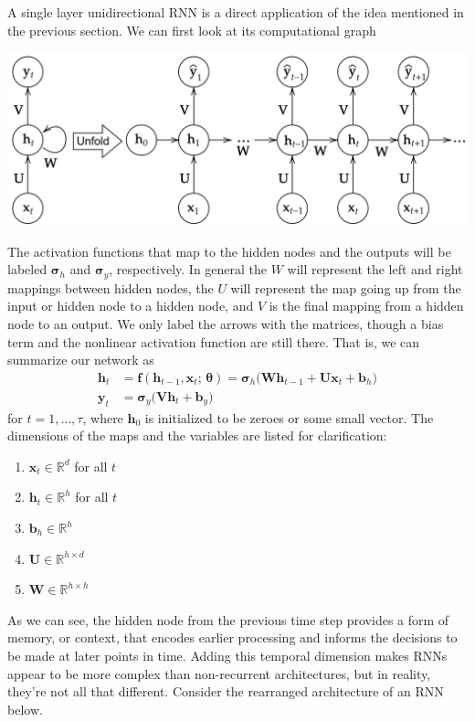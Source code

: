 \documentclass{article}
\theoremstyle{definition}
\theoremstyle{remark}
\theoremstyle{definition}
\begin{document}
A single layer unidirectional RNN is a direct application of the idea mentioned in the previous section. We can first look at its computational graph 
\begin{center}
    \includegraphics[scale=0.3]{img/RNNs/One_Layer_RNN.png}
\end{center}
The activation functions that map to the hidden nodes and the outputs will be labeled $\boldsymbol{\sigma}_{h}$ and $\boldsymbol{\sigma}_{y}$, respectively. In general the $W$ will represent the left and right mappings between hidden nodes, the $U$ will represent the map going up from the input or hidden node to a hidden node, and $V$ is the final mapping from a hidden node to an output. We only label the arrows with the matrices, though a bias term and the nonlinear activation function are still there. That is, we can summarize our network as
\begin{align*}
    \mathbf{h}_t & = \mathbf{f}( \mathbf{h}_{t - 1}, \mathbf{x}_{t} ; \, \boldsymbol{\theta}) = \boldsymbol{\sigma}_h \big( \mathbf{W} \mathbf{h}_{t - 1} + \mathbf{U} \mathbf{x}_t + \mathbf{b}_h \big) \\
    \mathbf{y}_t & = \boldsymbol{\sigma}_y \big( \mathbf{V} \mathbf{h}_t + \mathbf{b}_y \big) 
\end{align*}
for $t = 1, \ldots, \tau$, where $\mathbf{h}_0$ is initialized to be zeroes or some small vector. The dimensions of the maps and the variables are listed for clarification: 
\begin{enumerate}
    \item $\mathbf{x}_t \in \mathbb{R}^d$ for all $t$
    \item $\mathbf{h}_t \in \mathbb{R}^h$ for all $t$
    \item $\mathbf{b}_h \in \mathbb{R}^h$
    \item $\mathbf{U} \in \mathbb{R}^{h \times d}$
    \item $\mathbf{W} \in \mathbb{R}^{h \times h}$
\end{enumerate}
As we can see, the hidden node from the previous time step provides a form of memory, or context, that encodes earlier processing and informs the decisions to be made at later points in time. Adding this temporal dimension makes RNNs appear to be more complex than non-recurrent architectures, but in reality, they’re not all that different. Consider the rearranged architecture of an RNN below. 
\end{document}
